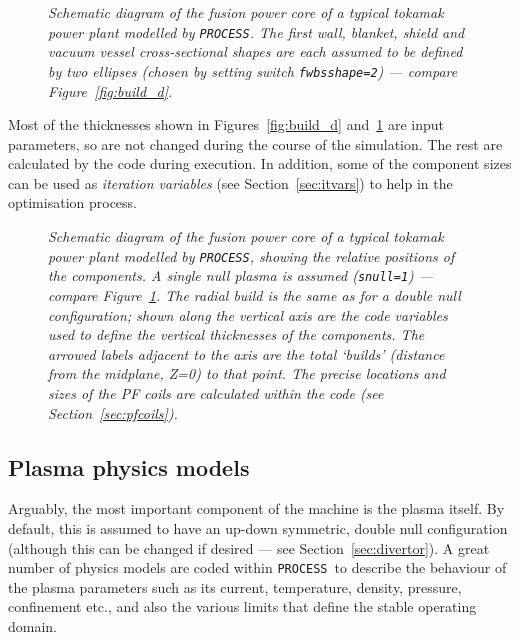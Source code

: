 \documentclass[11pt,a4paper]{report}
\newcommand{\process}{\mbox{\texttt{PROCESS}}}
\begin{document}
\begin{figure}[tbph]
\caption[Machine build for elliptical-shaped major components]
{\label{fig:build_e} \textit{Schematic diagram of the fusion
    power core of a typical tokamak power plant modelled by \process. The
    first wall, blanket, shield and vacuum vessel cross-sectional shapes are
    each assumed to be defined by two ellipses (chosen by setting switch
    \texttt{fwbsshape=2}) --- compare Figure~\ref{fig:build_d}.}  }
\end{figure}

Most of the thicknesses shown in Figures~\ref{fig:build_d} and~\ref{fig:build_e}
are input parameters, so are not changed during the course of the simulation.
The rest are calculated by the code during execution. In addition, some of the
component sizes can be used as \textit{iteration variables}\/ (see
Section~\ref{sec:itvars}) to help in the optimisation process.

\begin{figure}[tbph]
\caption[Machine build for a single-null device]
{\label{fig:buildsnd}
  \textit{Schematic diagram of the fusion power core of a typical tokamak
    power plant modelled by \process, showing the relative positions of the
    components. A single null plasma is assumed (\texttt{snull=1}) --- compare
    Figure~\ref{fig:build_e}. The radial build is the same as for a double null
    configuration; shown along the vertical axis are the code variables used
    to define the vertical thicknesses of the components. The arrowed labels
    adjacent to the axis are the total `builds' (distance from the midplane,
    Z=0) to that point. The precise locations and sizes of the  PF coils are
    calculated within the code (see Section~\ref{sec:pfcoils}).}
}
\end{figure}

\subsection{Plasma physics models}

Arguably, the most important component of the machine is the plasma itself. By
default, this is assumed to have an up-down symmetric, double null
configuration (although this can be changed if desired --- see
Section~\ref{sec:divertor}). A great number of physics models are coded within
\process\ to describe the behaviour of the plasma parameters such as its
current, temperature, density, pressure, confinement etc., and also the
various limits that define the stable operating domain.
\end{document}
